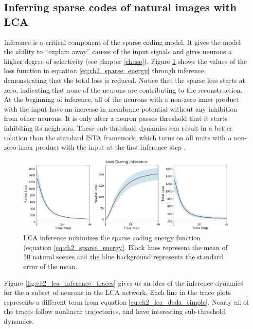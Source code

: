 \subsection{Inferring sparse codes of natural images with LCA}
Inference is a critical component of the sparse coding model. It gives the model the ability to ``explain away'' causes of the input signals \parencite{olshausen1997sparse} and gives neurons a higher degree of selectivity (see chapter \ref{ch:iso}). Figure \ref{fig:ch2_lca_inference_loss} shows the values of the loss function in equation \ref{eq:ch2_sparse_energy} through inference, demonstrating that the total loss is reduced. Notice that the sparse loss starts at zero, indicating that none of the neurons are contributing to the reconstruction. At the beginning of inference, all of the neurons with a non-zero inner product with the input have an increase in membrane potential without any inhibition from other neurons. It is only after a neuron passes threshold that it starts inhibiting its neighbors. These sub-threshold dynamics can result in a better solution than the standard ISTA framework, which turns on all units with a non-zero inner product with the input at the first inference step \cite{rozell2008sparse}.

\begin{figure}\label{fig:ch2_lca_inference_loss}
    \centering
    \includegraphics[width=\textwidth]{figures/lca_inference_loss.png}
    \caption{LCA inference minimizes the sparse coding energy function (equation \ref{eq:ch2_sparse_energy}. Black lines represent the mean of 50 natural scenes and the blue background represents the standard error of the mean.}
\end{figure}

Figure \ref{fig:ch2_lca_inference_traces} gives us an idea of the inference dynamics for the a subset of neurons in the LCA network. Each line in the trace plots represents a different term from equation \ref{eq:ch2_lca_deda_simple}. Nearly all of the traces follow nonlinear trajectories, and have interesting sub-threshold dynamics.

